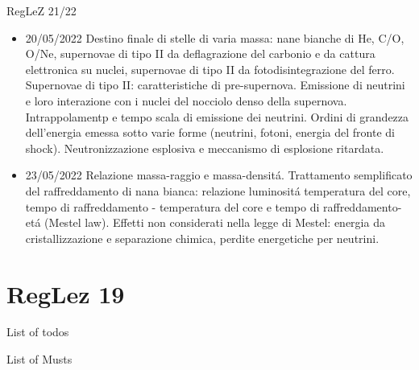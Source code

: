 \begin{frame}[allowframebreaks]{RegLeZ 21/22}
\begin{itemize}
\item 20/05/2022 Destino finale di stelle di varia massa: nane bianche di He, C/O, O/Ne, supernovae di tipo II da deflagrazione del carbonio e da cattura elettronica su nuclei, supernovae di tipo II da fotodisintegrazione del ferro. Supernovae di tipo II: caratteristiche di pre-supernova. Emissione di neutrini e loro interazione con i nuclei del nocciolo denso della supernova. Intrappolamentp e tempo scala di emissione dei neutrini. Ordini di grandezza dell'energia emessa sotto varie forme (neutrini, fotoni, energia del fronte di shock). Neutronizzazione esplosiva e meccanismo di esplosione ritardata.
\item 23/05/2022 Relazione massa-raggio e massa-densit\'a. Trattamento semplificato del raffreddamento di nana bianca: relazione luminosit\'a temperatura del core, tempo di raffreddamento - temperatura del core e tempo di raffreddamento-et\'a (Mestel law). Effetti non considerati nella legge di Mestel: energia da cristallizzazione e separazione chimica, perdite energetiche per neutrini.
\end{itemize}
\end{frame}

\section{RegLez 19}

\begin{frame}[allowframebreaks]{List of todos}
\listoftodos
\end{frame}


\begin{frame}[allowframebreaks]{List of Musts}
 \listofmusts
\end{frame}


